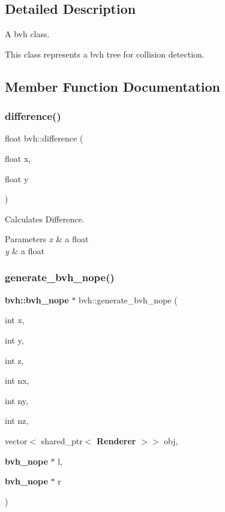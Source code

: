 \subsection{Detailed Description}
A bvh class. 

This class represents a bvh tree for collision detection. 

\subsection{Member Function Documentation}
\mbox{\label{classbvh_af03de72dbe5093bf25f20e298c3795e3}} 
\subsubsection{difference()}
{\footnotesize\ttfamily float bvh\+::difference (\begin{DoxyParamCaption}\item[{float}]{x,  }\item[{float}]{y }\end{DoxyParamCaption})\hspace{0.3cm}{\ttfamily [static]}}



Calculates Difference. 


\begin{DoxyParams}{Parameters}
{\em x} & a float \\
\hline
{\em y} & a float \\
\hline
\end{DoxyParams}
\mbox{\label{classbvh_a73de9aff9a9efb6fb38d861bed1beb70}} 
\subsubsection{generate\_bvh\_nope()}
{\footnotesize\ttfamily \textbf{ bvh\+::bvh\+\_\+nope} $\ast$ bvh\+::generate\+\_\+bvh\+\_\+nope (\begin{DoxyParamCaption}\item[{int}]{x,  }\item[{int}]{y,  }\item[{int}]{z,  }\item[{int}]{nx,  }\item[{int}]{ny,  }\item[{int}]{nz,  }\item[{vector$<$ shared\+\_\+ptr$<$ \textbf{ Renderer} $>$$>$}]{obj,  }\item[{\textbf{ bvh\+\_\+nope} $\ast$}]{l,  }\item[{\textbf{ bvh\+\_\+nope} $\ast$}]{r }\end{DoxyParamCaption})\hspace{0.3cm}{\ttfamily [static]}}



